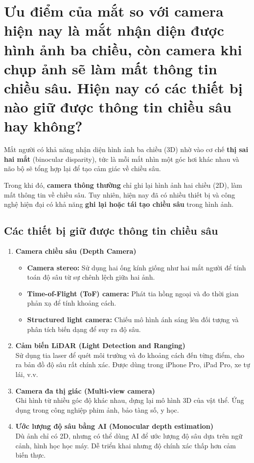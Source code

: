 \documentclass[12pt]{article}
\begin{document}
	\section{Ưu điểm của mắt so với camera hiện nay là mắt nhận diện được hình ảnh ba chiều, còn camera khi chụp ảnh sẽ làm mất thông tin chiều sâu. Hiện nay có các thiết bị nào giữ được thông tin chiều sâu hay không?}
	
	Mắt người có khả năng nhận diện hình ảnh ba chiều (3D) nhờ vào cơ chế \textbf{thị sai hai mắt} (binocular disparity), tức là mỗi mắt nhìn một góc hơi khác nhau và não bộ sẽ tổng hợp lại để tạo cảm giác về chiều sâu.
	
	Trong khi đó, \textbf{camera thông thường} chỉ ghi lại hình ảnh hai chiều (2D), làm mất thông tin về chiều sâu. Tuy nhiên, hiện nay đã có nhiều thiết bị và công nghệ hiện đại có khả năng \textbf{ghi lại hoặc tái tạo chiều sâu} trong hình ảnh.
	
	\subsection*{Các thiết bị giữ được thông tin chiều sâu}
	
	\begin{enumerate}
	\item \textbf{Camera chiều sâu (Depth Camera)}
	\begin{itemize}
	\item \textbf{Camera stereo:} Sử dụng hai ống kính giống như hai mắt người để tính toán độ sâu từ sự chênh lệch giữa hai ảnh.
	\item \textbf{Time-of-Flight (ToF) camera:} Phát tia hồng ngoại và đo thời gian phản xạ để tính khoảng cách.
	\item \textbf{Structured light camera:} Chiếu mô hình ánh sáng lên đối tượng và phân tích biến dạng để suy ra độ sâu.
	\end{itemize}
	
	\item \textbf{Cảm biến LiDAR (Light Detection and Ranging)} \\
	Sử dụng tia laser để quét môi trường và đo khoảng cách đến từng điểm, cho ra bản đồ độ sâu rất chính xác. Được dùng trong iPhone Pro, iPad Pro, xe tự lái, v.v.
	
	\item \textbf{Camera đa thị giác (Multi-view camera)} \\
	Ghi hình từ nhiều góc độ khác nhau, dựng lại mô hình 3D của vật thể. Ứng dụng trong công nghiệp phim ảnh, bảo tàng số, y học.
	
	\item \textbf{Ước lượng độ sâu bằng AI (Monocular depth estimation)} \\
	Dù ảnh chỉ có 2D, nhưng có thể dùng AI để ước lượng độ sâu dựa trên ngữ cảnh, hình học học máy. Dễ triển khai nhưng độ chính xác thấp hơn cảm biến thực.
	\end{enumerate}
	
\end{document}
